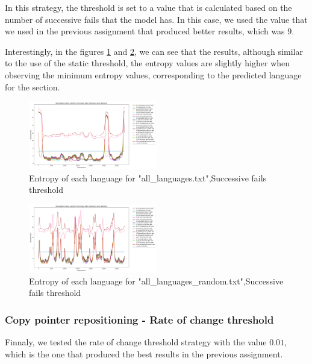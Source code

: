 \documentclass{article}
\begin{document}
In this strategy, the threshold is set to a value that is calculated based on the number of successive fails that the model has.
In this case, we used the value that we used in the previous assignment that produced better results, which was $9$.

Interestingly, in the figures \ref{fig:all_languages_t_f} and \ref{fig:all_languages_random_t_f}, we can see that the results, although similar to the use of the static threshold,
the entropy values are slightly higher when observing the minimum entropy values, corresponding to the predicted language for the section.

\begin{figure}
    \centering
    \includegraphics[width=0.5\textwidth]{../results/all_languages/-t_f:9.png}
    \caption{Entropy of each language for "all_languages.txt",Successive fails threshold}
    \label{fig:all_languages_t_f}
\end{figure}

\begin{figure}
    \centering
    \includegraphics[width=0.5\textwidth]{../results/all_languages_random/-t_f:9.png}
    \caption{Entropy of each language for "all_languages_random.txt",Successive fails threshold}
    \label{fig:all_languages_random_t_f}
\end{figure}

\subsubsection{Copy pointer repositioning - Rate of change threshold}
\label{subsubsec:results_locate_lang_rate_of_change_threshold}

Finnaly, we tested the rate of change threshold strategy with the value $0.01$, which is the one that produced the best results in the previous assignment.
\end{document}
